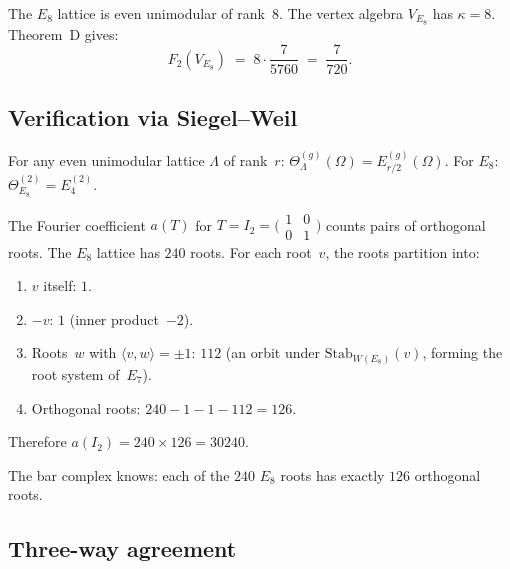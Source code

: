 The $E_8$ lattice is even unimodular of rank~$8$. The vertex
algebra $V_{E_8}$ has $\kappa = 8$. Theorem~D gives:
\begin{equation}\label{eq:comp-e8-f2}
 F_2(V_{E_8}) \;=\; 8 \cdot \frac{7}{5760}
 \;=\; \frac{7}{720}.
\end{equation}


\subsection{Verification via Siegel--Weil}
\label{subsec:comp-e8-siegel}

\begin{theorem}
\label{thm:comp-siegel-weil-e8}
\ClaimStatusProvedElsewhere
For any even unimodular lattice $\Lambda$ of rank~$r$:
$\Theta_\Lambda^{(g)}(\Omega) = E_{r/2}^{(g)}(\Omega)$.
For $E_8$: $\Theta_{E_8}^{(2)} = E_4^{(2)}$.
\end{theorem}

The Fourier coefficient
$a(T)$ for $T = I_2 = \bigl(\begin{smallmatrix} 1 & 0 \\
0 & 1 \end{smallmatrix}\bigr)$ counts pairs of orthogonal
roots. The $E_8$ lattice has $240$ roots. For each root~$v$,
the roots partition into:
\begin{enumerate}[label=\textup{(\roman*)}]
\item $v$ itself: $1$.
\item $-v$: $1$ (inner product~$-2$).
\item Roots~$w$ with $\langle v, w \rangle = \pm 1$: $112$
 (an orbit under $\mathrm{Stab}_{W(E_8)}(v)$, forming the
 root system of~$E_7$).
\item Orthogonal roots: $240 - 1 - 1 - 112 = 126$.
\end{enumerate}
Therefore $a(I_2) = 240 \times 126 = 30240$.

The bar complex knows: each of the $240$ $E_8$ roots has
exactly $126$ orthogonal roots.


\subsection{Three-way agreement}
\label{subsec:comp-e8-three-way}

